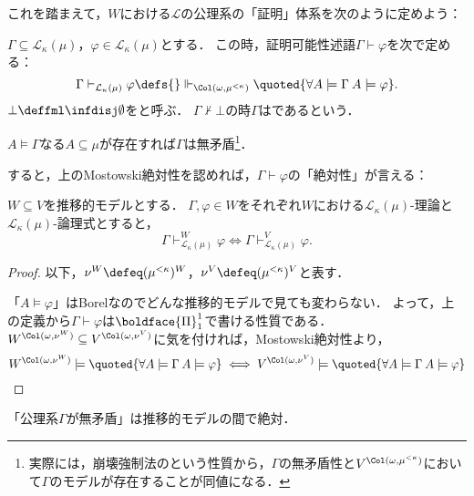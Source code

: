 \documentclass[a4j,leqno]{ltjsarticle}
\renewcommand{\emph}[1]{\textgt{\textsf{#1}}}
\begin{document}
これを踏まえて，$W$における$\mathcal{L}$の公理系の「証明」体系を次のように定めよう：
\begin{definition}
 $\Gamma \subseteq \mathcal{L}_\kappa(\mu)$，$\varphi \in \mathcal{L}_\kappa(\mu)$とする．
 この時，証明可能性述語$\Gamma \vdash \varphi$を次で定める：
 \[
 \Gamma \vdash_{\mathcal{L}_\kappa(\mu)} \varphi \defs {}\Vdash_{\Col(\omega, \mu^{<\kappa})} \quoted{\forall A \models \Gamma \: A \models \varphi}.
 \]
 $\bot \deffml \infdisj \emptyset$を\emph{矛盾}と呼ぶ．
 $\Gamma \nvdash \bot$の時$\Gamma$は\emph{無矛盾}であるという．
\end{definition}
\begin{remark}\label{rem:consis-witness}
 $A \models \Gamma$なる$A \subseteq \mu$が存在すれば$\Gamma$は無矛盾\footnote{実際には，崩壊強制法の\emph{均質性}という性質から，$\Gamma$の無矛盾性と$V^{\Col(\omega, \mu^{<\kappa})}$において$\Gamma$のモデルが存在することが同値になる．}．
\end{remark}

すると，上のMostowski絶対性を認めれば，$\Gamma \vdash \varphi$の「絶対性」が言える：
\begin{lemma}
 $W \subseteq V$を推移的モデルとする．
 $\Gamma, \varphi \in W$をそれぞれ$W$における$\mathcal{L}_\kappa(\mu)$-理論と$\mathcal{L}_\kappa(\mu)$-論理式とすると，
 \[
 \Gamma \vdash_{\mathcal{L}_\kappa(\mu)}^W \varphi \iff \Gamma \vdash^{V}_{\mathcal{L}_\kappa(\mu)} \varphi.
 \]
\end{lemma}
\begin{proof}
 以下，$\nu^W \defeq (\mu^{<\kappa})^W$，$\nu^V \defeq (\mu^{<\kappa})^V$と表す．

 「$A \models \varphi$」はBorelなのでどんな推移的モデルで見ても変わらない．
 よって，上の定義から$\Gamma \vdash \varphi$は$\boldface{\Pi}^1_1$で書ける性質である．
 $W^{\Col(\omega, \nu^W)} \subseteq V^{\Col(\omega, \nu^V)}$に気を付ければ，Mostowski絶対性より，
 \[
  W^{\Col(\omega, \nu^W)} \models \quoted{\forall A \models \Gamma \: A \models \varphi}
 \iff
  V^{\Col(\omega, \nu^{V})} \models \quoted{\forall A \models \Gamma \: A \models \varphi}
 \]
\end{proof}
\begin{corollary}\label{cor:consis-abs}
 「公理系$\Gamma$が無矛盾」は推移的モデルの間で絶対．
\end{corollary}
\end{document}
